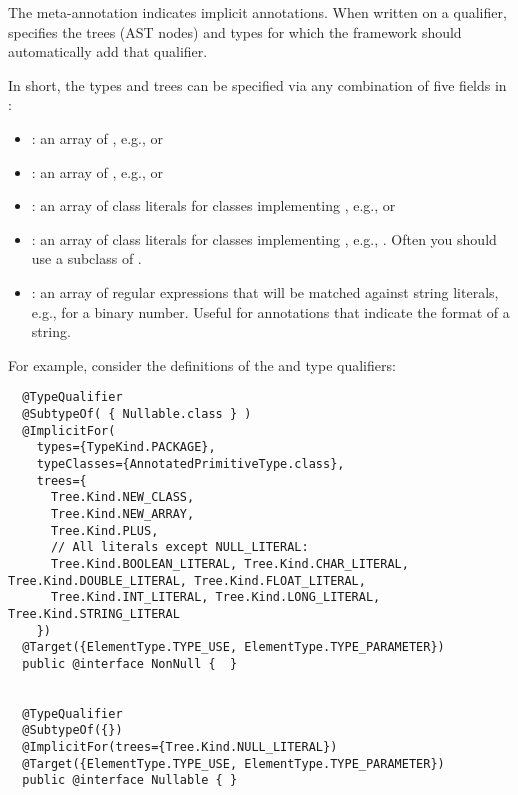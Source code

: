 The  meta-annotation indicates implicit annotations.
When written on a qualifier, 
specifies the trees (AST nodes) and types for which the framework should
automatically add that qualifier.

In short, the types and trees can be
specified via any combination of five fields in :

  \begin{itemize}
  \item {}: an array of
    \href{\TreeAPIBase{}/tree/Tree.Kind.html?is-external=true}{}, e.g.,
     or 
  \item {}: an array of
    , e.g., 
    or 
  \item
    \begin{sloppypar}
    : an array of class literals for classes
    implementing , e.g.,
     or 
    \end{sloppypar}
  \item {}: an array of class literals for classes
    implementing , e.g.,
    .  Often you should use
    a subclass of .
  \item {}: an array of regular expressions that will
    be matched against
    string literals, e.g.,  for a binary number.  Useful
    for annotations that indicate the format of a string.
  \end{itemize}

For example, consider the definitions of the  and 
type qualifiers:

\begin{smaller}
\begin{Verbatim}
  @TypeQualifier
  @SubtypeOf( { Nullable.class } )
  @ImplicitFor(
    types={TypeKind.PACKAGE},
    typeClasses={AnnotatedPrimitiveType.class},
    trees={
      Tree.Kind.NEW_CLASS,
      Tree.Kind.NEW_ARRAY,
      Tree.Kind.PLUS,
      // All literals except NULL_LITERAL:
      Tree.Kind.BOOLEAN_LITERAL, Tree.Kind.CHAR_LITERAL, Tree.Kind.DOUBLE_LITERAL, Tree.Kind.FLOAT_LITERAL,
      Tree.Kind.INT_LITERAL, Tree.Kind.LONG_LITERAL, Tree.Kind.STRING_LITERAL
    })
  @Target({ElementType.TYPE_USE, ElementType.TYPE_PARAMETER})
  public @interface NonNull {  }


  @TypeQualifier
  @SubtypeOf({})
  @ImplicitFor(trees={Tree.Kind.NULL_LITERAL})
  @Target({ElementType.TYPE_USE, ElementType.TYPE_PARAMETER})
  public @interface Nullable { }
\end{Verbatim}
\end{smaller}

